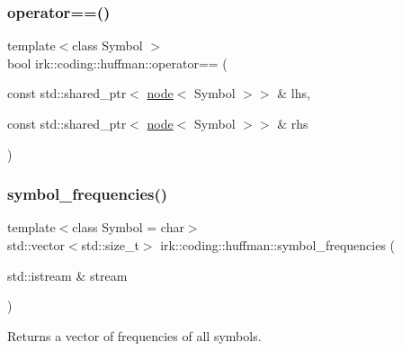 \subsubsection{\texorpdfstring{operator==()}{operator==()}}
{\footnotesize\ttfamily template$<$class Symbol $>$ \\
bool irk\+::coding\+::huffman\+::operator== (\begin{DoxyParamCaption}\item[{const std\+::shared\+\_\+ptr$<$ \mbox{\hyperlink{structirk_1_1coding_1_1huffman_1_1node}{node}}$<$ Symbol $>$$>$ \&}]{lhs,  }\item[{const std\+::shared\+\_\+ptr$<$ \mbox{\hyperlink{structirk_1_1coding_1_1huffman_1_1node}{node}}$<$ Symbol $>$$>$ \&}]{rhs }\end{DoxyParamCaption})}

\mbox{\label{namespaceirk_1_1coding_1_1huffman_a12058e132e33e4021454d6a29ef17ef4}} 
\subsubsection{\texorpdfstring{symbol\+\_\+frequencies()}{symbol\_frequencies()}}
{\footnotesize\ttfamily template$<$class Symbol  = char$>$ \\
std\+::vector$<$std\+::size\+\_\+t$>$ irk\+::coding\+::huffman\+::symbol\+\_\+frequencies (\begin{DoxyParamCaption}\item[{std\+::istream \&}]{stream }\end{DoxyParamCaption})}



Returns a vector of frequencies of all symbols. 

